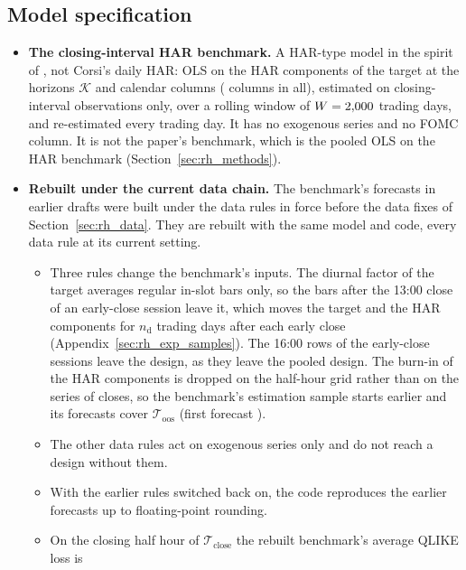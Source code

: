 \subsection{Model specification}
\label{app:rh_closing_sample}
\label{app:rh_closing_bench}
\label{app:rh_closing_predictors}
\begin{itemize}
\item \textbf{The closing-interval HAR benchmark.} A HAR-type model in the spirit of \citet{Corsi2009}, not Corsi's
  daily HAR: OLS on the HAR components of the target at the horizons $\mathcal K$ and \rhdmNCalendar{} calendar
  columns (\cmPNewBase{} columns in all), estimated on closing-interval observations only, over a rolling window of
  $W = 2{,}000$ trading days, and re-estimated every trading day. It has no exogenous series and no FOMC column.
  It is not the paper's benchmark, which is the pooled OLS on the HAR benchmark (Section~\ref{sec:rh_methods}).
\item \textbf{Rebuilt under the current data chain.} The benchmark's forecasts in earlier drafts were built under the
  data rules in force before the data fixes of Section~\ref{sec:rh_data}. They are rebuilt with the same model and
  code, every data rule at its current setting.
  \begin{itemize}
  \item Three rules change the benchmark's inputs. The diurnal factor of the target averages regular in-slot bars
    only, so the bars after the 13:00 close of an early-close session leave it, which moves the target and the HAR
    components for $n_{\mathrm{d}}$ trading days after each early close (Appendix~\ref{sec:rh_exp_samples}). The
    16:00 rows of the early-close sessions leave the design, as they leave the pooled design. The burn-in of the HAR
    components is dropped on the half-hour grid rather than on the series of closes, so the benchmark's estimation
    sample starts earlier and its forecasts cover $\mathcal T_{\mathrm{oos}}$ (first forecast \rhciFirst).
  \item The other data rules act on exogenous series only and do not reach a design without them.
  \item With the earlier rules switched back on, the code reproduces the earlier forecasts up to floating-point
    rounding.
  \item On the closing half hour of $\mathcal T_{\mathrm{close}}$ the rebuilt benchmark's average QLIKE loss is

\end{itemize}
\end{itemize}
